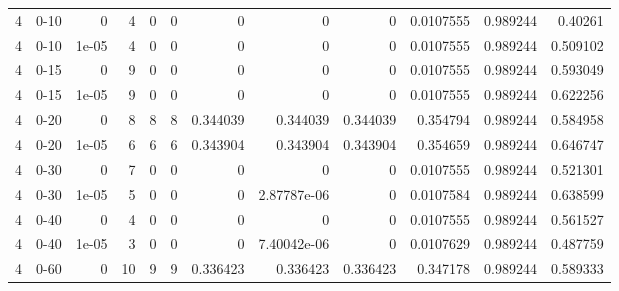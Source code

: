 \begin{tabular}{rlrrrrrrrrrr}
     4 & 0-10   &      0     &           4 &                 0 &                 0 &     0           &     0           &      0           &        0.0107555 &               0.989244 &           0.40261  \\
     4 & 0-10   &      1e-05 &           4 &                 0 &                 0 &     0           &     0           &      0           &        0.0107555 &               0.989244 &           0.509102 \\
     4 & 0-15   &      0     &           9 &                 0 &                 0 &     0           &     0           &      0           &        0.0107555 &               0.989244 &           0.593049 \\
     4 & 0-15   &      1e-05 &           9 &                 0 &                 0 &     0           &     0           &      0           &        0.0107555 &               0.989244 &           0.622256 \\
     4 & 0-20   &      0     &           8 &                 8 &                 8 &     0.344039    &     0.344039    &      0.344039    &        0.354794  &               0.989244 &           0.584958 \\
     4 & 0-20   &      1e-05 &           6 &                 6 &                 6 &     0.343904    &     0.343904    &      0.343904    &        0.354659  &               0.989244 &           0.646747 \\
     4 & 0-30   &      0     &           7 &                 0 &                 0 &     0           &     0           &      0           &        0.0107555 &               0.989244 &           0.521301 \\
     4 & 0-30   &      1e-05 &           5 &                 0 &                 0 &     0           &     2.87787e-06 &      0           &        0.0107584 &               0.989244 &           0.638599 \\
     4 & 0-40   &      0     &           4 &                 0 &                 0 &     0           &     0           &      0           &        0.0107555 &               0.989244 &           0.561527 \\
     4 & 0-40   &      1e-05 &           3 &                 0 &                 0 &     0           &     7.40042e-06 &      0           &        0.0107629 &               0.989244 &           0.487759 \\
     4 & 0-60   &      0     &          10 &                 9 &                 9 &     0.336423    &     0.336423    &      0.336423    &        0.347178  &               0.989244 &           0.589333 \\

\end{tabular}
